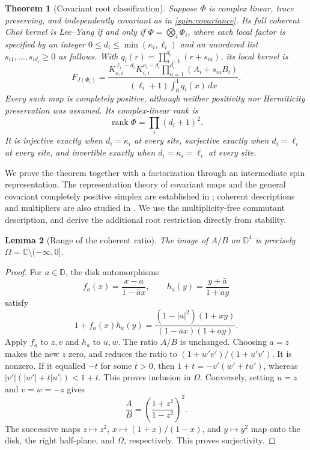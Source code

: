 \documentclass[reqno]{amsart}
\newtheorem{theorem}{Theorem}[section]
\newtheorem{lemma}[theorem]{Lemma}
\theoremstyle{definition}
\theoremstyle{remark}
\newcommand{\C}{\mathbb C}
\newcommand{\D}{\mathbb D}
\DeclareMathOperator{\rank}{rank}
\begin{document}
\begin{theorem}[Covariant root classification]\label{spin:covariant}
Suppose $\Phi$ is complex linear, trace preserving, and independently
covariant as in \eqref{spin:covariance}.  Its full coherent Choi kernel is
Lee--Yang if and only if $\Phi=\bigotimes_i\Phi_i$, where each local
factor is specified by an integer $0\leq d_i\leq\min(\kappa_i,\ell_i)$
and an unordered list $s_{i1},\ldots,s_{id_i}\geq0$ as follows.  With
$q_i(r)=\prod_{a=1}^{d_i}(r+s_{ia})$, its local kernel is
\begin{equation}\label{spin:covariant-kernel}
 F_{J(\Phi_i)}=
 \frac{K_{o,i}^{\ell_i-d_i}K_{i,i}^{\kappa_i-d_i}
            \prod_{a=1}^{d_i}(A_i+s_{ia}B_i)}
      {(\ell_i+1)\int_0^1q_i(x)\,dx}.
\end{equation}
Every such map is completely positive, although neither positivity nor
Hermiticity preservation was assumed.  Its complex-linear rank is
\begin{equation}\label{spin:covariant-rank}
 \rank\Phi=\prod_i(d_i+1)^2.
\end{equation}
It is injective exactly when $d_i=\kappa_i$ at every site, surjective
exactly when $d_i=\ell_i$ at every site, and invertible exactly when
$d_i=\kappa_i=\ell_i$ at every site.
\end{theorem}

We prove the theorem together with a factorization through an intermediate
spin representation.  The representation theory of covariant maps and
the general covariant completely positive simplex are established in
\cite{AlNuwairan14}; coherent descriptions and multipliers are also
studied in \cite{ARS24}.  We use the multiplicity-free commutant
description, and derive the additional root restriction directly from
stability.

\begin{lemma}[Range of the coherent ratio]\label{spin:ratio}
The image of $A/B$ on $\D^4$ is precisely
$\Omega=\C\setminus(-\infty,0]$.
\end{lemma}

\begin{proof}
For $a\in\D$, the disk automorphisms
\[
 f_a(x)=\frac{x-a}{1-\bar a x},\qquad
 h_a(y)=\frac{y+\bar a}{1+ay}
\]
satisfy
\[
 1+f_a(x)h_a(y)=
 \frac{(1-|a|^2)(1+xy)}{(1-\bar a x)(1+ay)}.
\]
Apply $f_a$ to $z,v$ and $h_a$ to $u,w$.  The ratio $A/B$ is unchanged.
Choosing $a=z$ makes the new $z$ zero, and reduces the ratio to
$(1+w'v')/(1+u'v')$.  It is nonzero.  If it equalled $-t$ for some
$t>0$, then $1+t=-v'(w'+tu')$, whereas
$|v'|(|w'|+t|u'|)<1+t$.  This proves inclusion in $\Omega$.
Conversely, setting $u=z$ and $v=w=-z$ gives
\[
 \frac AB=\left(\frac{1+z^2}{1-z^2}\right)^2.
\]
The successive maps $z\mapsto z^2$, $x\mapsto(1+x)/(1-x)$, and
$y\mapsto y^2$ map onto the disk, the right half-plane, and $\Omega$,
respectively.  This proves surjectivity.
\end{proof}
\end{document}
